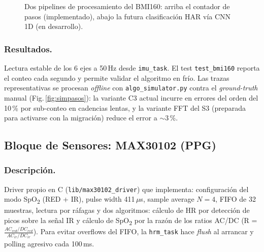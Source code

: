 \documentclass[letterpaper,11pt]{article}
\newcommand{\rfigura}[1]{Fig.\,\ref{#1}}
\begin{document}
\begin{figure}[H]
    \centering
    \resizebox{0.95\linewidth}{!}{}
    \caption{Dos pipelines de procesamiento del BMI160: arriba el contador de pasos
    (implementado), abajo la futura clasificación HAR vía CNN 1D (en desarrollo).}
    \label{fig:mlpipeline}
\end{figure}

\subsubsection{Resultados.} Lectura estable de los 6 ejes a 50\,Hz desde \texttt{imu\_task}.
El test \texttt{test\_bmi160} reporta el conteo cada segundo y permite validar el algoritmo
en frío. Las trazas representativas se procesan \textit{offline} con
\texttt{algo\_simulator.py} contra el \textit{ground-truth} manual (\rfigura{fig:simpasos}):
la variante C3 actual incurre en errores del orden del 10\,\% por sub-conteo en cadencias
lentas, y la variante FFT del S3 (preparada para activarse con la migración) reduce el
error a $\sim$3\,\%.

\subsection{Bloque de Sensores: MAX30102 (PPG)}
\subsubsection{Descripción.} Driver propio en C (\texttt{lib/max30102\_driver}) que implementa:
configuración del modo SpO\textsubscript{2} (RED + IR), pulse width 411\,$\mu$s, sample
average $N=4$, FIFO de 32 muestras, lectura por ráfagas y dos algoritmos: cálculo de HR por
detección de picos sobre la señal IR y cálculo de SpO\textsubscript{2} por la razón de los
ratios AC/DC (R = $\frac{AC_{red}/DC_{red}}{AC_{ir}/DC_{ir}}$). Para evitar overflows del
FIFO, la \texttt{hrm\_task} hace \textit{flush} al arrancar y polling agresivo cada 100\,ms.
\end{document}

